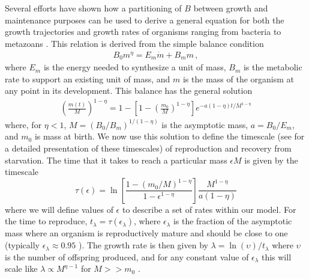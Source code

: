 \documentclass{pnastwo}
\begin{document}
\begin{article}
Several efforts have shown how a partitioning of $B$ between growth and
maintenance purposes can be used to derive a general equation for both the
growth trajectories and growth rates of organisms ranging from bacteria to
metazoans
\cite{West:2001bv,moses2008rmo,gillooly2002esa,hou,Kempes:2012hy}. This relation is derived from the simple balance condition \cite{West:2001bv,moses2008rmo,gillooly2002esa,hou,Kempes:2012hy}
\begin{eqnarray}
\label{balance}
B_{0}m^{\eta}=E_{m}\dot{m}+B_{m}m\,,
\end{eqnarray}
where $E_{m}$ is the energy needed to synthesize a unit of mass, $B_{m}$ is
the metabolic rate to support an existing unit of mass, and $m$ is the mass
of the organism at any point in its development.  This balance has the
general solution \cite{bettencourt,Kempes:2012hy}
\begin{eqnarray}
\label{m1}
\left(\frac{m\left(t\right)}{M}\right)^{1-\eta}\!=1\!-\!\left[1\!-\!\left(\frac{m_{0}}{M}\right)^{1\!-\!\eta}\right]e^{-a\left(1\!-\!\eta\right)t/M^{1-\eta}}
\end{eqnarray}
where, for $\eta<1$, $M=(B_{0}/B_{m})^{1/(1-\eta)}$ is the asymptotic mass, $a=B_{0}/E_{m}$, and $m_0$ is mass at birth.  We now use this solution to define the timescale (see \cite{moses2008rmo} for a detailed presentation of these timescales) of reproduction and recovery from starvation. The time that it takes to reach a particular mass $\epsilon M$ is given by the timescale 
\begin{equation}
\label{t1}
\tau\left(\epsilon\right) = \ln\left[\frac{1-\left(m_{0}/M\right)^{1-\eta}}{1-\epsilon^{1-\eta}}\right]\frac{M^{1-\eta}}{a\left(1-\eta\right)}
\end{equation}
where we will define values of $\epsilon$ to describe a set of rates within our model. For the time to reproduce, $t_{\lambda}=\tau\left(\epsilon_{\lambda}\right)$, where $\epsilon_{\lambda}$ is the fraction of the asymptotic mass where an organism is reproductively mature and should be close to one (typically $\epsilon_{\lambda}\approx0.95$ \cite{West:2001bv}). The growth rate is then given by $\lambda=\ln\left(\upsilon\right)/t_{\lambda}$ where $\upsilon$ is the number of offspring produced, and for any constant value of $\epsilon_{\lambda}$ this will scale like $\lambda\propto M^{\eta-1}$ for $M>>m_{0}$ \cite{West:2001bv,moses2008rmo,gillooly2002esa,hou,Kempes:2012hy}.


\end{article}
\end{document}
